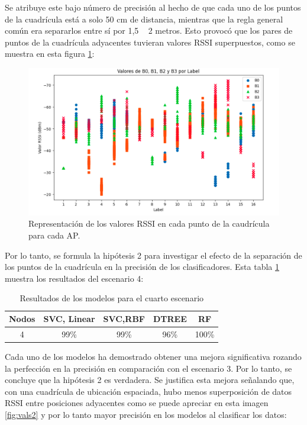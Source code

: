 Se atribuye este bajo número de precisión al hecho de que cada uno de los puntos de la cuadrícula está a solo 50 cm de distancia, mientras que la regla general común era separarlos entre sí por 1,5 ~ 2 metros. Esto provocó que los pares de puntos de la cuadrícula adyacentes tuvieran valores RSSI superpuestos, como se muestra en esta figura \ref{fig:vals1}:



\begin{figure}[H]
  \centering
  \includegraphics[scale=0.4]{figs/vals1} %
  \caption{ Representación de los valores RSSI en cada punto de la caudrícula para cada AP.}
  \label{fig:vals1}
\end{figure} 

Por lo tanto, se formula la hipótesis 2 para investigar el efecto de la separación de los puntos de la cuadrícula en la precisión de los clasificadores. Esta tabla \ref{cuadro:tabla2} muestra los resultados del escenario 4:

\begin{table}[H]
\begin{center}
\begin{tabular}{|c|c|c|c|c|}
\hline
\textbf{Nodos} & \textbf{SVC, Linear} & \textbf{SVC,RBF} & \textbf{DTREE} & \textbf{RF} \\
\hline
4 & 99\% & 99\% & 96\% & 100\% \\  
\hline
\end{tabular}
\caption{Resultados de los modelos para el cuarto escenario}
\label{cuadro:tabla2}
\end{center}
\end{table}


Cada uno de los modelos ha demostrado obtener una mejora significativa rozando la perfección en la precisión en comparación con el escenario 3. Por lo tanto, se concluye que la hipótesis 2 es verdadera. Se justifica esta mejora señalando que, con una cuadrícula de ubicación espaciada, hubo menos superposición de datos RSSI entre posiciones adyacentes como se puede apreciar en esta imagen \ref{fig:vals2} y por lo tanto mayor precisión en los modelos al clasificar los datos:

